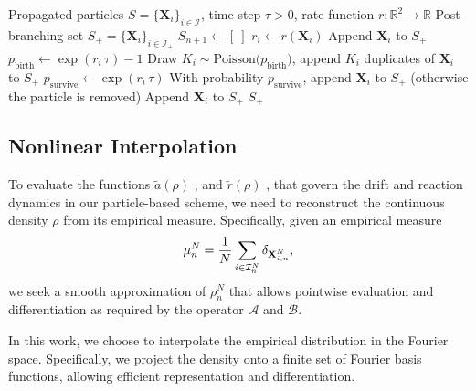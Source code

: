 \documentclass[a4paper,fleqn]{cas-sc}
\theoremstyle{definition}
\theoremstyle{remark}
\begin{document}
\begin{algorithm}
\caption{Birth--Death Step}\label{alg:birthdeath}
\begin{algorithmic}
\Require Propagated particles $S=\{\mathbf X_{i}\}_{i\in\mathcal I}$, time step $\tau>0$, rate function $r:\mathbb R^2\to\mathbb R$
\Ensure Post-branching set $S_{+}=\{\mathbf X_{i}\}_{i\in\mathcal I_{+}}$
    \State $S_{n+1}\gets [\ ]$
        \State $r_i \gets r(\mathbf X_{i})$
         
            \State Append $\mathbf X_{i}$ to $S_{+}$ 
            \State $p_{\mathrm{birth}} \gets \exp(r_i\,\tau) - 1$
            \State Draw $K_i \sim \mathrm{Poisson}\!\big(p_{\mathrm{birth}}\big)$, append $K_i$ duplicates of $\mathbf X_{i}$ to $S_{+}$
         
            \State $p_{\mathrm{survive}}\gets \exp(r_i\,\tau)$ 
            \State With probability $p_{\mathrm{survive}}$, append $\mathbf X_{i}$ to $S_{+}$
            \State \quad (otherwise the particle is removed)
        \Else {}
            \State Append $\mathbf X_{i}$ to $S_{+}$
        \EndIf
    \EndFor
    \State \Return $S_{+}$
\EndProcedure
\end{algorithmic}
\end{algorithm}




\subsection{Nonlinear Interpolation}
\label{sec:interpolation}
To evaluate the functions $\tilde a(\rho)$ , and $\tilde r(\rho)$ , that govern the drift and reaction dynamics in our particle-based scheme, we need to reconstruct the continuous density 
$\rho$ from its empirical measure. Specifically, given an empirical measure
\[
\mu^N_n= \frac{1}{N}\sum_{i\in \mathcal I^N_n}\delta_{\mathbf{X}_{i,n}^N},
\] 
we seek a smooth approximation of $\rho^N_n$ that allows pointwise evaluation and differentiation as required by the operator $\mathcal{A}$ and $\mathcal{B}$.

In this work, we choose to interpolate the empirical distribution in the Fourier space. Specifically, we project the density onto a finite set of Fourier basis functions, allowing efficient representation and differentiation. 
\end{document}
